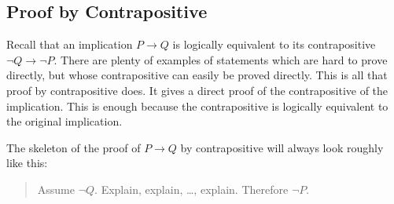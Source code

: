 \documentclass[10pt,]{book}
\theoremstyle{plain}
\theoremstyle{definition}
\theoremstyle{definition}
\theoremstyle{definition}
\numberwithin{equation}{chapter}
\def\imp{\rightarrow}
\begin{document}
\subsection[Proof by Contrapositive]{Proof by Contrapositive}\label{subsection-33}

%
\par

Recall that an implication \(P \imp Q\) is logically equivalent to its contrapositive \(\neg Q \imp \neg P\). There are plenty of examples of statements which are hard to prove directly, but whose contrapositive can easily be proved directly. This is all that proof by contrapositive does. It gives a direct proof of the contrapositive of the implication. This is enough because the contrapositive is logically equivalent to the original implication.
%
\par

The skeleton of the proof of \(P \imp Q\) by contrapositive will always look roughly like this:
%
\begin{quote}
Assume \(\neg Q\).  Explain, explain, \ldots, explain.  Therefore \(\neg P\).
\end{quote}
\par
\end{document}
